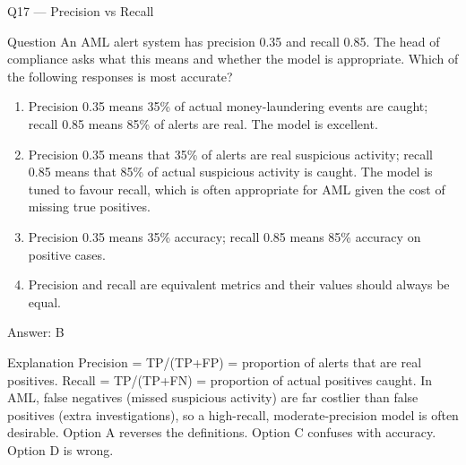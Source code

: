 \documentclass[aspectratio=169,8pt]{beamer}
\begin{document}
	\begin{frame}{Q17 --- Precision vs Recall}
		\begin{block}{Question}
			An AML alert system has precision 0.35 and recall 0.85. The head of compliance asks what this means and whether the model is appropriate. Which of the following responses is most accurate?
		\end{block}
		\begin{enumerate}
			\item Precision 0.35 means 35\% of actual money-laundering events are caught; recall 0.85 means 85\% of alerts are real. The model is excellent.
			\item Precision 0.35 means that 35\% of alerts are real suspicious activity; recall 0.85 means that 85\% of actual suspicious activity is caught. The model is tuned to favour recall, which is often appropriate for AML given the cost of missing true positives.
			\item Precision 0.35 means 35\% accuracy; recall 0.85 means 85\% accuracy on positive cases.
			\item Precision and recall are equivalent metrics and their values should always be equal.
		\end{enumerate}
		\begin{exampleblock}{Answer: B}\end{exampleblock}
		\begin{block}{Explanation}
			Precision = TP/(TP+FP) = proportion of alerts that are real positives. Recall = TP/(TP+FN) = proportion of actual positives caught. In AML, false negatives (missed suspicious activity) are far costlier than false positives (extra investigations), so a high-recall, moderate-precision model is often desirable. Option A reverses the definitions. Option C confuses with accuracy. Option D is wrong.
		\end{block}
	\end{frame}
	
\end{document}
